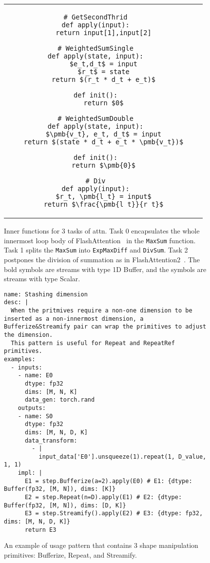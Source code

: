\begin{figure}[htbp]
\begin{tabular}{c c c}
{\begin{lstlisting}[language=step, mathescape=true, basicstyle=\scriptsize\ttfamily, linewidth=0.3\textwidth]
# GetSecondThrid
def apply(input):
    return input[1],input[2]

# WeightedSumSingle
def apply(state, input):
    $e_t,d_t$ = input
    $r_t$ = state
    return $(r_t * d_t + e_t)$

def init():
    return $0$

# WeightedSumDouble
def apply(state, input):
    $\pmb{v_t}, e_t, d_t$ = input
    return $(state * d_t + e_t * \pmb{v_t})$

def init():
    return $\pmb{0}$

# Div
def apply(input):
    $r_t, \pmb{l_t} = input$
    return $\frac{\pmb{l_t}}{r_t}$

\end{lstlisting}}

\end{tabular}

\caption{Inner functions for 3 tasks of attn. Task 0 encapsulates the whole innermost loop body of FlashAttention~\cite{dao2022flashattention} in the \texttt{MaxSum} function. Task 1 splits the \texttt{MaxSum} into \texttt{ExpMaxDiff} and \texttt{DivSum}. Task 2 postpones the division of summation as in FlashAttention2~\cite{dao2023flashattention}. The bold symbols are streams with type 1D Buffer, and the symbols are streams with type Scalar.}
\label{fig:attn-tasks}
\end{figure}

\begin{figure}[htbp]
\centering
\begin{lstlisting}[language=step, mathescape=true, basicstyle=\scriptsize\ttfamily]
name: Stashing dimension
desc: |
  When the pritmives require a non-one dimension to be inserted as a non-innermost dimension, a Bufferize&Streamify pair can wrap the primitives to adjust the dimension.
  This pattern is useful for Repeat and RepeatRef primitives.
examples:
  - inputs:
    - name: E0
      dtype: fp32
      dims: [M, N, K]
      data_gen: torch.rand
    outputs:
    - name: S0
      dtype: fp32
      dims: [M, N, D, K]
      data_transform:
        - |
          input_data['E0'].unsqueeze(1).repeat(1, D_value, 1, 1)
    impl: |
      E1 = step.Bufferize(a=2).apply(E0) # E1: {dtype: Buffer(fp32, [M, N]), dims: [K]}
      E2 = step.Repeat(n=D).apply(E1) # E2: {dtype: Buffer(fp32, [M, N]), dims: [D, K]}
      E3 = step.Streamify().apply(E2) # E3: {dtype: fp32, dims: [M, N, D, K]}
      return E3

\end{lstlisting}
\caption{An example of usage pattern that contains 3 shape manipulation primitives: Bufferize, Repeat, and Streamify.}
\label{fig:example-pattern}
\end{figure}

